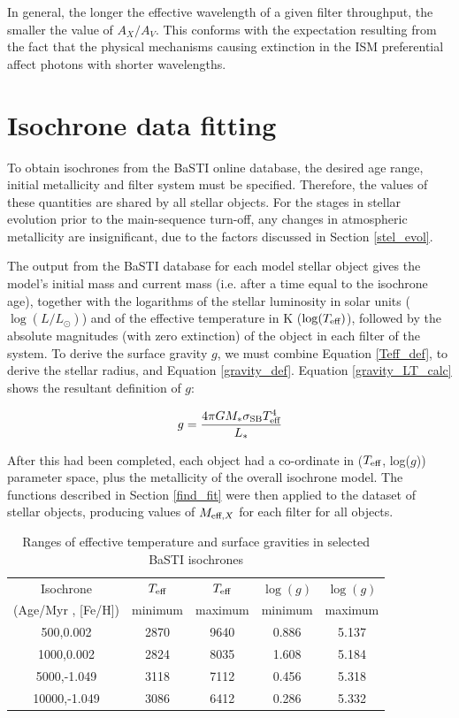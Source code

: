 \documentclass[12pt, a4paper]{report}
\begin{document}
In general, the longer the effective wavelength of a given filter throughput, the smaller the value of $A_{X}/A_{V}$. This conforms with the expectation resulting from the fact that the physical mechanisms causing extinction in the ISM preferential affect photons with shorter wavelengths.


\section{Isochrone data fitting}
To obtain isochrones from the BaSTI online database, the desired age range, initial metallicity and filter system must be specified. Therefore, the values of these quantities are shared by all stellar objects. For the stages in stellar evolution prior to the main-sequence turn-off, any changes in atmospheric metallicity are insignificant, due to the factors discussed in Section \ref{stel_evol}.

The output from the BaSTI database for each model stellar object gives the model's initial mass and current mass (i.e. after a time equal to the isochrone age), together with the logarithms of the stellar luminosity in solar units ($\log(L/L_{\odot})$) and of the effective temperature in K ($\log(T_{\textnormal{eff}})$), followed by the absolute magnitudes (with zero extinction) of the object in each filter of the system. To derive the surface gravity $g$, we must combine Equation \ref{Teff_def}, to derive the stellar radius, and Equation \ref{gravity_def}. Equation \ref{gravity_LT_calc} shows the resultant definition of $g$:

\begin{equation}
\label{gravity_LT_calc}
g = \frac{4 \pi G M_{*} \sigma_{\textnormal{SB}} T_{\textnormal{eff}}^{4}}{L_{*}}
\end{equation}

After this had been completed, each object had a co-ordinate in ($T_{\textnormal{eff}}$, log($g$)) parameter space, plus the metallicity of the overall isochrone model. The functions described in Section \ref{find_fit} were then applied to the dataset of stellar objects, producing values of $M_{\textnormal{eff},X}$ for each filter for all objects.

\begin{table}
\begin{center}
\begin{tabular}{ccccc}
\hline
Isochrone & $T_{\textnormal{eff}}$ & $T_{\textnormal{eff}}$ & $\log(g)$ & $\log(g)$ \\
(Age/Myr , [Fe/H]) & minimum & maximum & minimum & maximum \\
\hline
500,0.002 & 2870 & 9640 & 0.886 & 5.137 \\
1000,0.002 & 2824 & 8035 & 1.608 & 5.184 \\
5000,-1.049 & 3118 & 7112 & 0.456 & 5.318 \\
10000,-1.049 & 3086 & 6412 & 0.286 & 5.332 \\
\hline
\end{tabular}
\caption{Ranges of effective temperature and surface gravities in selected BaSTI isochrones}
\label{variable_ranges}
\end{center}
\end{table}
\end{document}
